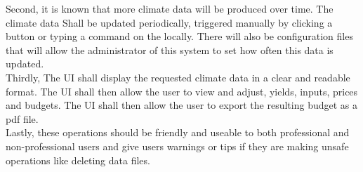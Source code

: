 \documentclass[letterpaper,10pt]{article}
\begin{document}
    Second, it is known that more climate data will be produced over time. The climate data Shall be updated periodically, triggered manually by clicking a button or typing a command on the locally. There will also be configuration files that will allow the administrator of this system to set how often this data is updated.\\
    
    Thirdly, The UI shall display the requested climate data in a clear and readable format. The UI shall then allow the user to view and adjust, yields, inputs, prices and budgets. The UI shall then allow the user to export the resulting budget as a pdf file.\\
    
    Lastly, these operations should be friendly and useable to both professional and non-professional users and give users warnings or tips if they are making unsafe operations like deleting data files.\\
\end{document}
